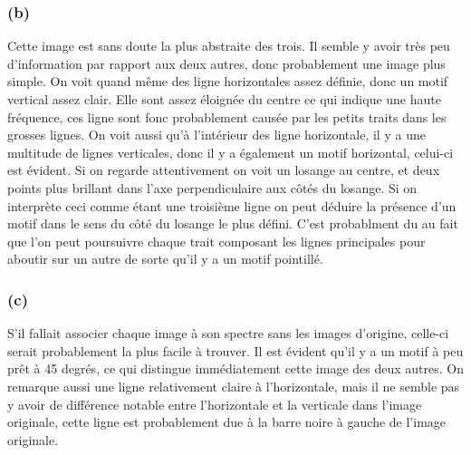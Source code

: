 \documentclass[12pt]{article}
\begin{document}
\vspace{2cm}

\subsubsection{(b)}
\begin{figure}
  \centering
  \caption{}
\end{figure}
Cette image est sans doute la plus abstraite des trois. Il semble y avoir très peu d'information par rapport aux deux autres, donc probablement une image plus simple. On voit quand même des ligne horizontales assez définie, donc un motif vertical assez clair. Elle sont assez éloignée du centre ce qui indique une haute fréquence, ces ligne sont fonc probablement causée par les petits traits dans les grosses lignes. On voit aussi qu'à l'intérieur des ligne horizontale, il y a une multitude de lignes verticales, donc il y a également un motif horizontal, celui-ci est évident. Si on regarde attentivement on voit un losange au centre, et deux points plus brillant dans l'axe perpendiculaire aux côtés du losange. Si on interprète ceci comme étant une troisième ligne on peut déduire la présence d'un motif dans le sens du côté du losange le plus défini. C'est probablment du au fait que l'on peut poursuivre chaque trait composant les lignes principales pour aboutir sur un autre de sorte qu'il y a un motif pointillé.

\subsubsection{(c)}
\begin{figure}
  \centering
  \caption{}
\end{figure}
S'il fallait associer chaque image à son spectre sans les images d'origine, celle-ci serait probablement la plus facile à trouver. Il est évident qu'il y a un motif à peu prêt à 45 degrés, ce qui distingue immédiatement cette image des deux autres. On remarque aussi une ligne relativement claire à l'horizontale, mais il ne semble pas y avoir de différence notable entre l'horizontale et la verticale dans l'image originale, cette ligne est probablement due à la barre noire à gauche de l'image originale.
\end{document}

